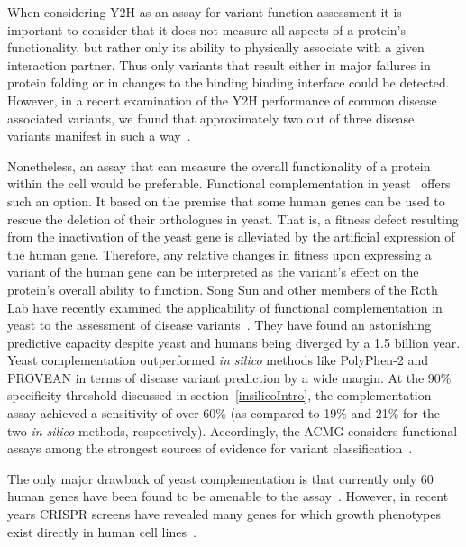 
When considering Y2H as an assay for variant function assessment it is important to consider that it does not measure all aspects of a protein's functionality, but rather only its ability to physically associate with a given interaction partner. Thus only variants that result either in major failures in protein folding or in changes to the binding binding interface could be detected. However, in a recent examination of the Y2H performance of common disease associated variants, we found that approximately two out of three disease variants manifest in such a way~\cite{sahni_widespread_2015}. 



Nonetheless, an assay that can measure the overall functionality of a protein within the cell would be preferable. Functional complementation in yeast~\cite{lee_complementation_1987,osborn_rescuing_2007} offers such an option. It based on the premise that some human genes can be used to rescue the deletion of their orthologues in yeast. That is, a fitness defect resulting from the inactivation of the yeast gene is alleviated by the artificial expression of the human gene. Therefore, any relative changes in fitness upon expressing a variant of the human gene can be interpreted as the variant's effect on the protein's overall ability to function. Song Sun and other members of the Roth Lab have recently examined the applicability of functional complementation in yeast to the assessment of disease variants~\cite{sun_extended_2016}. They have found an astonishing predictive capacity despite yeast and humans being diverged by a 1.5 billion year. Yeast complementation outperformed \textit{in silico} methods like PolyPhen-2 and PROVEAN in terms of disease variant prediction by a wide margin. At the 90\% specificity threshold discussed in section~\ref{insilicoIntro}, the complementation assay achieved a sensitivity of over 60\% (as compared to 19\% and 21\% for the two \textit{in silico} methods, respectively). Accordingly, the ACMG considers functional assays among the strongest sources of evidence for variant classification~\cite{richards_standards_2015}.

The only major drawback of yeast complementation is that currently only 60 human genes have been found to be amenable to the assay~\cite{sun_extended_2016}. However, in recent years CRISPR screens have revealed many genes for which growth phenotypes exist directly in human cell lines~. 


